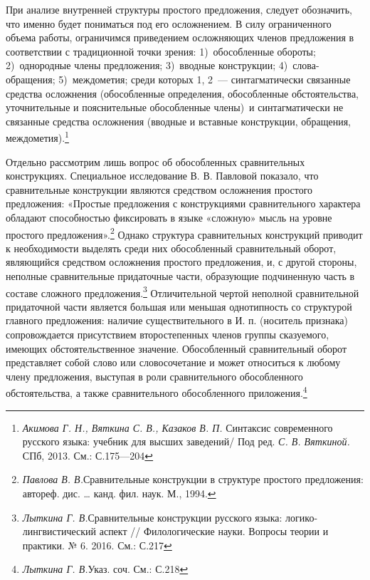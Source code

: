 \documentclass{kursa4}
\begin{document}
{      При анализе внутренней структуры простого предложения, следует обозначить, что именно будет пониматься под его осложнением. В силу ограниченного объема работы, ограничимся приведением осложняющих членов предложения в соответствии с традиционной точки зрения: 1)~обособленные обороты; 2)~однородные члены предложения; 3)~вводные конструкции; 4)~слова-обращения; 5)~междометия; среди которых 1, 2~--- синтагматически связанные средства осложнения (обособленные определения, обособленные обстоятельства, уточнительные и пояснительные обособленные члены)~и синтагматически не связанные средства осложнения (вводные и вставные конструкции, обращения, междометия).\footnote{\textit{Акимова Г. Н., Вяткина С. В., Казаков В. П. }Синтаксис современного русского языка: учебник для высших заведений/ Под ред. \textit{С. В. Вяткиной.} СПб, 2013. См.: С.175—204} 

      Отдельно рассмотрим лишь вопрос об обособленных сравнительных конструкциях. Специальное исследование В. В. Павловой показало, что сравнительные конструкции являются средством осложнения простого предложения: «Простые предложения с конструкциями сравнительного характера обладают способностью фиксировать в языке «сложную» мысль на уровне простого предложения».\footnote{\textit{Павлова В. В.}Сравнительные конструкции в структуре простого предложения: автореф. дис. … канд. фил. наук. М., 1994.} Однако структура сравнительных конструкций приводит к необходимости выделять среди них обособленный сравнительный оборот, являющийся средством осложнения простого предложения, и, с другой стороны, неполные сравнительные придаточные части, образующие подчиненную часть в составе сложного предложения.\footnote{\textit{Лыткина Г. В.}Сравнительные конструкции русского языка: логико-лингвистический аспект // Филологические науки. Вопросы теории и практики. № 6. 2016. См.: С.217} Отличительной чертой неполной сравнительной придаточной части является большая или меньшая однотипность со структурой главного предложения: наличие существительного в И. п. (носитель признака) сопровождается присутствием второстепенных членов группы сказуемого, имеющих обстоятельственное значение.  Обособленный сравнительный оборот представляет собой слово или словосочетание и может относиться к любому члену предложения, выступая в роли сравнительного обособленного обстоятельства, а также сравнительного обособленного приложения.\footnote{\textit{Лыткина Г. В.}Указ. соч. См.: С.218} 

}
\end{document}
